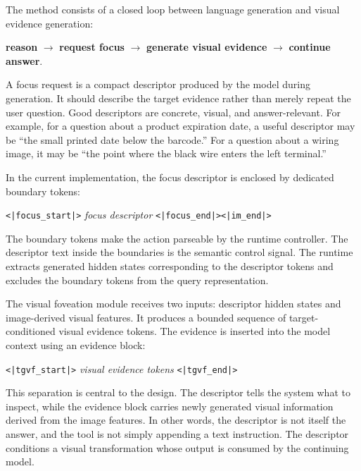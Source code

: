 \documentclass[10pt,twocolumn]{article}
\newcommand{\focusstart}{\texttt{<|focus\_start|>}}
\newcommand{\focusend}{\texttt{<|focus\_end|>}}
\newcommand{\tgvfstart}{\texttt{<|tgvf\_start|>}}
\newcommand{\tgvfend}{\texttt{<|tgvf\_end|>}}
\newcommand{\imend}{\texttt{<|im\_end|>}}
\begin{document}
The method consists of a closed loop between language generation and visual evidence generation:

\begin{center}
\small
\textbf{reason} $\rightarrow$ \textbf{request focus} $\rightarrow$ \textbf{generate visual evidence} $\rightarrow$ \textbf{continue answer}.
\end{center}

A focus request is a compact descriptor produced by the model during generation. It should describe the target evidence rather than merely repeat the user question. Good descriptors are concrete, visual, and answer-relevant. For example, for a question about a product expiration date, a useful descriptor may be ``the small printed date below the barcode.'' For a question about a wiring image, it may be ``the point where the black wire enters the left terminal.''

In the current implementation, the focus descriptor is enclosed by dedicated boundary tokens:

\begin{center}
\small
\focusstart{} \;\textit{focus descriptor}\; \focusend{}\imend{}
\end{center}

The boundary tokens make the action parseable by the runtime controller. The descriptor text inside the boundaries is the semantic control signal. The runtime extracts generated hidden states corresponding to the descriptor tokens and excludes the boundary tokens from the query representation.

The visual foveation module receives two inputs: descriptor hidden states and image-derived visual features. It produces a bounded sequence of target-conditioned visual evidence tokens. The evidence is inserted into the model context using an evidence block:

\begin{center}
\small
\tgvfstart{} \;\textit{visual evidence tokens}\; \tgvfend{}
\end{center}

This separation is central to the design. The descriptor tells the system what to inspect, while the evidence block carries newly generated visual information derived from the image features. In other words, the descriptor is not itself the answer, and the tool is not simply appending a text instruction. The descriptor conditions a visual transformation whose output is consumed by the continuing model.
\end{document}
